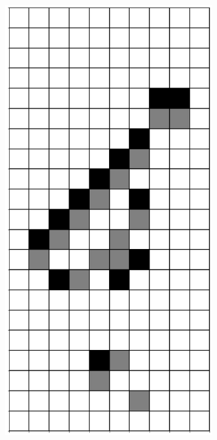 \documentclass[12pt]{article}
\numberwithin{figure}{section} %
\begin{document}
\begin{figure}[H]
\begin{subfigure}{0.3\textwidth}
     \subcaption{}
   \end{subfigure}
        \begin{subfigure}{0.3\textwidth}
     \centering
     \includegraphics[angle=270,width=\linewidth]{Section4/23.5}

\end{subfigure}
\end{figure}
\end{document}
